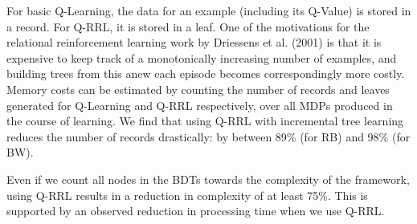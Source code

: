 


For basic Q-Learning, the data for an example (including its Q-Value) is stored 
in a record. For Q-RRL, it is stored in a leaf. 
One of the motivations for the relational reinforcement learning work by 
Driessens et al. (2001) is that it is expensive to keep track of a monotonically 
increasing number of examples, and building trees from this anew each episode 
becomes correspondingly more costly.  
Memory costs can be estimated by counting the number of records and leaves 
generated for Q-Learning and Q-RRL respectively, over all MDPs produced in the 
course of learning. 
We find that using Q-RRL with incremental tree learning reduces the number of 
records drastically: by between 89\% (for RB) and 98\% (for BW). 

Even if we count all nodes in the BDTs towards the complexity of the framework, 
using Q-RRL results in a reduction in complexity of at least 75\%.
This is supported by an observed reduction in processing time when we use Q-RRL.



